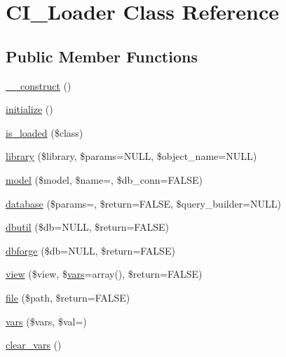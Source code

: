 \hypertarget{class_c_i___loader}{}\section{C\+I\+\_\+\+Loader Class Reference}
\label{class_c_i___loader}
\subsection*{Public Member Functions}
\begin{DoxyCompactItemize}
\item 
\mbox{\hyperlink{class_c_i___loader_a56d6528e81d45b264b76394c89f062ce}{\+\_\+\+\_\+construct}} ()
\item 
\mbox{\hyperlink{class_c_i___loader_a91836c1d132ac63ef37003d6e02cf4ee}{initialize}} ()
\item 
\mbox{\hyperlink{class_c_i___loader_acd71bb8962f4ac5cb330488c10aff7c2}{is\+\_\+loaded}} (\$class)
\item 
\mbox{\hyperlink{class_c_i___loader_a83b0240592edae85ace9467989c33688}{library}} (\$library, \$params=N\+U\+LL, \$object\+\_\+name=N\+U\+LL)
\item 
\mbox{\hyperlink{class_c_i___loader_a09e93ffd92b6ec19c0a7913a5a45d098}{model}} (\$model, \$name=\textquotesingle{}\textquotesingle{}, \$db\+\_\+conn=F\+A\+L\+SE)
\item 
\mbox{\hyperlink{class_c_i___loader_a01eca3757c2231e7c3cb1062a04514bf}{database}} (\$params=\textquotesingle{}\textquotesingle{}, \$return=F\+A\+L\+SE, \$query\+\_\+builder=N\+U\+LL)
\item 
\mbox{\hyperlink{class_c_i___loader_a776df69394e362393153e1b9a566baaf}{dbutil}} (\$db=N\+U\+LL, \$return=F\+A\+L\+SE)
\item 
\mbox{\hyperlink{class_c_i___loader_af53dd30c83b65f25ed8edeeddfc25251}{dbforge}} (\$db=N\+U\+LL, \$return=F\+A\+L\+SE)
\item 
\mbox{\hyperlink{class_c_i___loader_a25fa5a0e0ff940b7859bbf89ce77f719}{view}} (\$view, \$\mbox{\hyperlink{class_c_i___loader_a25d97e2518910ee0790d3dbbac1c013f}{vars}}=array(), \$return=F\+A\+L\+SE)
\item 
\mbox{\hyperlink{class_c_i___loader_a7b2a676fae23b6a49a8eef9ff7f18e13}{file}} (\$path, \$return=F\+A\+L\+SE)
\item 
\mbox{\hyperlink{class_c_i___loader_a25d97e2518910ee0790d3dbbac1c013f}{vars}} (\$vars, \$val=\textquotesingle{}\textquotesingle{})
\item 
\mbox{\hyperlink{class_c_i___loader_a2237b1de2f66e6062bc9eba5b236f01f}{clear\+\_\+vars}} ()

\end{DoxyCompactItemize}
